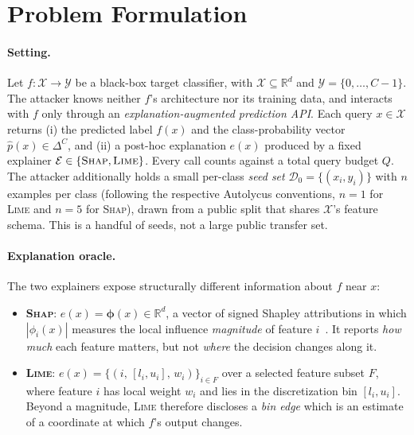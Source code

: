 \documentclass[sigconf,anonymous,review]{acmart}
\begin{document}
\section{Problem Formulation}
\label{sec:problem}

\paragraph{Setting.}
Let $f : \mathcal{X} \to \mathcal{Y}$ be a black-box target classifier, with
$\mathcal{X} \subseteq \mathbb{R}^d$ and $\mathcal{Y} = \{0, \ldots, C{-}1\}$.
The attacker knows neither $f$'s architecture nor its training data, and interacts
with $f$ only through an \emph{explanation-augmented prediction API}.
Each query $x \in \mathcal{X}$ returns (i) the predicted label $f(x)$ and the
class-probability vector $\hat{p}(x) \in \Delta^{C}$, and (ii) a post-hoc
explanation $e(x)$ produced by a fixed explainer
$\mathcal{E} \in \{\textsc{Shap}, \textsc{Lime}\}$.
Every call counts against a total query budget $Q$.
The attacker additionally holds a small per-class \emph{seed set}
$\mathcal{D}_{0} = \{(x_i, y_i)\}$ with $n$ examples per class (following the respective
Autolycus conventions, $n{=}1$ for \textsc{Lime} and $n{=}5$ for \textsc{Shap}), drawn from a
public split that shares $\mathcal{X}$'s feature schema. This is a handful of seeds, not a large public transfer set.

\paragraph{Explanation oracle.}
The two explainers expose structurally different information about $f$ near $x$:
\begin{itemize}
  \item \textbf{\textsc{Shap}}: $e(x) = \bm{\phi}(x) \in \mathbb{R}^{d}$, a vector of
  signed Shapley attributions in which $|\phi_i(x)|$ measures the local influence
  \emph{magnitude} of feature $i$~\cite{lundberg2017shap}. It reports \emph{how much}
  each feature matters, but not \emph{where} the decision changes along it.
  \item \textbf{\textsc{Lime}}: $e(x) = \{(i,\, [l_i, u_i],\, w_i)\}_{i \in F}$ over a
  selected feature subset $F$, where feature $i$ has local weight $w_i$ and lies in
  the discretization bin $[l_i, u_i]$. Beyond a magnitude, \textsc{Lime} therefore
  discloses a \emph{bin edge} which is an estimate of a coordinate at which $f$'s output
  changes.
\end{itemize}
\end{document}
